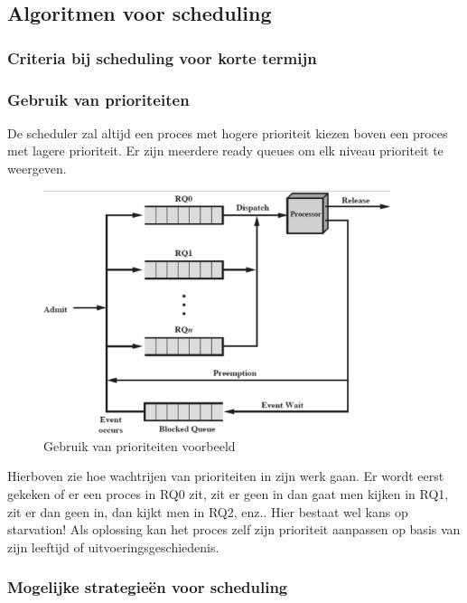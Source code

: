 \subsection{Algoritmen voor scheduling}

\subsubsection{Criteria bij scheduling voor korte termijn}

\subsubsection{Gebruik van prioriteiten}

De scheduler zal altijd een proces met hogere prioriteit kiezen boven een proces met lagere prioriteit. Er zijn meerdere ready queues om elk niveau prioriteit te weergeven.

\begin{figure}[htp]
    \centering
            \includegraphics[width=4in]{img/gebruikvanprioriteiten.png}
        \caption{Gebruik van prioriteiten voorbeeld}
    \label{fig:Gebruik van prioriteiten voorbeeld}
\end{figure}
 
Hierboven zie hoe wachtrijen van prioriteiten in zijn werk gaan. Er wordt eerst gekeken of er een proces in RQ0 zit, zit er geen in dan gaat men kijken in RQ1, zit er dan geen in, dan kijkt men in RQ2, enz.. Hier bestaat wel kans op starvation! Als oplossing kan het proces zelf zijn prioriteit aanpassen op basis van zijn leeftijd of uitvoeringsgeschiedenis.


\subsubsection{Mogelijke strategieën voor scheduling}


